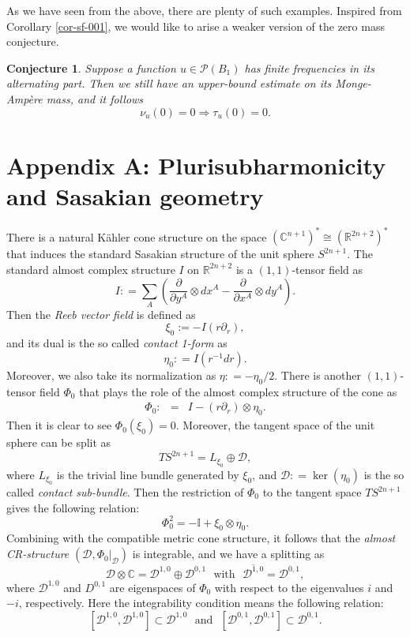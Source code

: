 \documentclass[a4paper,11pt]{amsart}
\numberwithin{equation}{section}
\newtheorem{conj}[theorem]{Conjecture}
\def\d{\partial}
\def\cP{{\mathcal P}}
\def\cD{{\mathcal D}}
\def\cP{{\mathcal P}}
\def\bC{{\mathbb C}}
\def\bR{{\mathbb R}}
\begin{document}
As we have seen from the above,
there are plenty of such examples. 
Inspired from Corollary \ref{cor-sf-001}, 
we would like to arise a weaker version of the zero mass conjecture.

\begin{conj}
\label{conj-001}
Suppose a function $u\in \cP(B_1)$ has finite frequencies in its alternating part. 
Then we still have an upper-bound estimate on its Monge-Amp\`ere mass, and it follows
$$ \nu_u(0) =0 \Rightarrow \tau_u(0) =0.  $$
\end{conj}





\bigskip


\section{Appendix A: Plurisubharmonicity and Sasakian geometry}
\smallskip

There is a natural K\"ahler cone structure on the space $(\bC^{n+1})^*\cong (\bR^{2n+2})^*$
that induces the standard Sasakian structure of the unit sphere $S^{2n+1}$. 
The standard almost complex structure $I$ on $\bR^{2n+2}$ is a $(1,1)$-tensor field as 
$$ I: = \sum_A \left(  \frac{\d}{\d y^A} \otimes dx^A    - \frac{\d}{\d x^A} \otimes dy^A  \right).  $$
Then the \emph{Reeb vector field} is defined as 
$$ \xi_0:= - I (r\d_r), $$
and its dual is the so called \emph{contact 1-form} as 
$$ \eta_0: = I (r^{-1} dr).  $$
Moreover, we also take its normalization as 
$ \eta: = -\eta_0/2$.
There is another $(1,1)$-tensor field $\Phi_0$ that plays the role of the almost complex structure of the cone as
\begin{eqnarray}
\label{ss-001}
\Phi_0: &=& I - (r\d_r) \otimes \eta_0.  
\end{eqnarray}
Then it is clear to see $\Phi_0 (\xi_0) =0$. 
Moreover, the tangent space of the unit sphere can be split as 
$$ TS^{2n+1} = L_{\xi_0} \oplus \cD, $$
where $L_{\xi_0}$ is the trivial line bundle generated by $\xi_0$,  
and $\cD: = \ker (\eta_0)$ is the so called \emph{contact sub-bundle}. 
Then the restriction of $\Phi_0$ to the tangent space $TS^{2n+1}$ gives the following relation: 
$$ \Phi_0^2 = -\mathbb{I} + \xi_0 \otimes \eta_0. $$ 
Combining with the compatible metric cone structure, 
it follows that the \emph{almost CR-structure} $(\cD, \Phi_0|_{\cD})$
is integrable, and we have a splitting as 
\begin{equation}
\label{ss-002}
\cD \otimes  \bC = \cD^{1,0} \oplus \cD^{0,1} \ \ \ \text{with} \ \ \   \overline{\cD^{1,0}} = \cD^{0,1},
\end{equation}
where $\cD^{1,0}$ and $D^{0,1}$ are eigenspaces of $\Phi_0$
with respect to the eigenvalues $i$ and $-i$, respectively. 
Here the integrability condition means the following relation:
$$ \left[ \cD^{1,0}, \cD^{1,0}  \right] \subset \cD^{1,0} \ \ \ \text{and} \ \ \  \left[ \cD^{0,1}, \cD^{0,1}  \right] \subset \cD^{0,1}.$$
\end{document}

